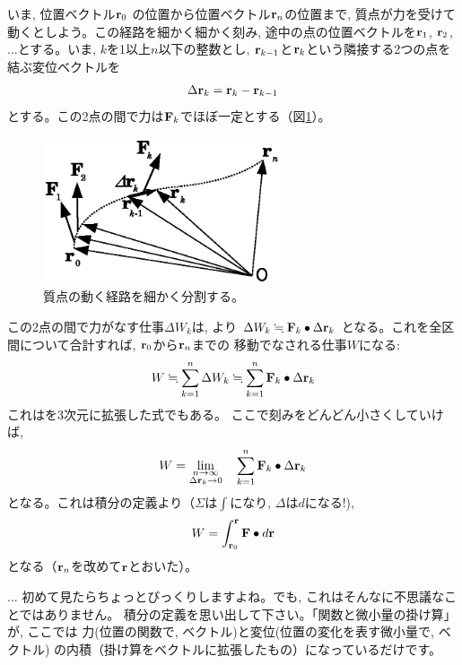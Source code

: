 いま, 位置ベクトル${\bf r}_0$
の位置から位置ベクトル${\bf r}_n$の位置まで, 質点が力を受けて動くとしよう。この経路を細かく細かく刻み, 
途中の点の位置ベクトルを${\bf r}_1$, ${\bf r}_2$, ...とする。いま, $k$を1以上$n$以下の整数とし, 
${\bf r}_{k-1}$と${\bf r}_k$という隣接する2つの点を結ぶ変位ベクトルを
\begin{eqnarray}
\Delta {\bf r}_k={\bf r}_k-{\bf r}_{k-1}
\end{eqnarray}
とする。この2点の間で力は${\bf F}_k$でほぼ一定とする（図\ref{fig:work_3D}）。\mv
\begin{figure}[h]
    \centering
    \includegraphics[width=7cm]{work_3D.eps}
    \caption{質点の動く経路を細かく分割する。}\label{fig:work_3D}
\end{figure}
この2点の間で力がなす仕事$\Delta W_k$は, 
より
$\Delta W_k\fallingdotseq{\bf F}_k\bullet\Delta {\bf r}_k$
となる。これを全区間について合計すれば, ${\bf r}_0$から${\bf r}_n$までの
移動でなされる仕事$W$になる:
\begin{eqnarray} 
W\fallingdotseq\sum_{k=1}^n \Delta W_k\fallingdotseq\sum_{k=1}^n {\bf F}_k\bullet\Delta {\bf r}_k
\end{eqnarray}
これはを3次元に拡張した式でもある。 
ここで刻みをどんどん小さくしていけば, 
\begin{eqnarray}
W=\lim_{\substack{n\rightarrow \infty\\\Delta {\bf r}_k\rightarrow 0}}\quad\sum_{k=1}^n{\bf F}_k\bullet\Delta {\bf r}_k
\end{eqnarray}
となる。これは積分の定義より（$\Sigma$は$\int$になり, $\Delta$は$d$になる!), 
\begin{eqnarray} 
W=\int_{{\bf r}_0}^{{\bf r}} {\bf F}\bullet d{\bf r}
\end{eqnarray} 
となる（${\bf r}_n$を改めて${\bf r}$とおいた）。

\begin{faq}{\small{} ... 
初めて見たらちょっとびっくりしますよね。でも, これはそんなに不思議なことではありません。
積分の定義を思い出して下さい。「関数と微小量の掛け算」が, ここでは
力(位置の関数で, ベクトル)と変位(位置の変化を表す微小量で, ベクトル)
の内積（掛け算をベクトルに拡張したもの）になっているだけです。}\end{faq}\mv

